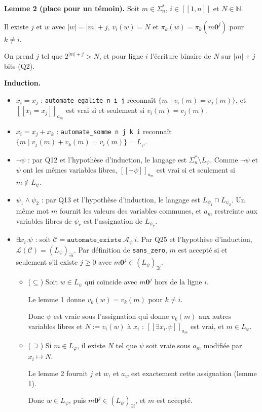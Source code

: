 \documentclass[11pt,a4paper]{article}
\providecommand{\tightlist}{\setlength{\itemsep}{0pt}\setlength{\parskip}{0pt}}
\begin{document}
\textbf{Lemme 2 (place pour un témoin).} Soit \(m\in\Sigma_n^*\), \(i\in[\![1,n]\!]\) et \(N\in\mathbb{N}\).

Il existe \(j\) et \(w\) avec \(|w|=|m|+j\), \(v_i(w)=N\) et \(\pi_k(w)=\pi_k(m{\mathbf{0}}^j)\) pour \(k\ne i\).

On prend \(j\) tel que \(2^{|m|+j}>N\), et pour ligne \(i\) l'écriture binaire de \(N\) sur \(|m|+j\) bits (Q2).

\textbf{Induction.}

\begin{itemize}
\tightlist
\item
  \textbf{\(x_i=x_j\)} : \texttt{automate\_egalite\ n\ i\ j} reconnaît \(\{m\mid v_i(m)=v_j(m)\}\), et \([\![x_i=x_j]\!]_{a_m}\) est vrai si et seulement si \(v_i(m)=v_j(m)\).
\item
  \textbf{\(x_i=x_j+x_k\)} : \texttt{automate\_somme\ n\ j\ k\ i} reconnaît \(\{m\mid v_j(m)+v_k(m)=v_i(m)\}=L_\varphi\).
\item
  \textbf{\(\neg\psi\)} : par Q12 et l'hypothèse d'induction, le langage est \(\Sigma_n^*\setminus L_\psi\). Comme \(\neg\psi\) et \(\psi\) ont les mêmes variables libres, \([\![\neg\psi]\!]_{a_m}\) est vrai si et seulement si \(m\notin L_\psi\).
\item
  \textbf{\(\psi_1\wedge\psi_2\)} : par Q13 et l'hypothèse d'induction, le langage est \(L_{\psi_1}\cap L_{\psi_2}\). Un même mot \(m\) fournit les valeurs des variables communes, et \(a_m\) restreinte aux variables libres de \(\psi_r\) est l'assignation de \(L_{\psi_r}\).
\item
  \textbf{\(\exists x_i.\psi\)} : soit \(\mathcal{C}=\texttt{automate\_existe}\ {\mathcal{A}}_\psi\ i\). Par Q25 et l'hypothèse d'induction, \(\mathcal{L}(\mathcal{C})=(L_\psi)_{\exists i}\). Par définition de \texttt{sans\_zero}, \(m\) est accepté si et seulement s'il existe \(j\ge0\) avec \(m{\mathbf{0}}^j\in(L_\psi)_{\exists i}\).

  \begin{itemize}
  \item
    (\(\subseteq\)) Soit \(w\in L_\psi\) qui coïncide avec \(m{\mathbf{0}}^j\) hors de la ligne \(i\).

    Le lemme 1 donne \(v_k(w)=v_k(m)\) pour \(k\ne i\).

    Donc \(\psi\) est vraie sous l'assignation qui donne \(v_k(m)\) aux autres variables libres et \(N:=v_i(w)\) à \(x_i\) : \([\![\exists x_i.\psi]\!]_{a_m}\) est vrai, et \(m\in L_\varphi\).
  \item
    (\(\supseteq\)) Si \(m\in L_\varphi\), il existe \(N\) tel que \(\psi\) soit vraie sous \(a_m\) modifiée par \(x_i\mapsto N\).

    Le lemme 2 fournit \(j\) et \(w\), et \(a_w\) est exactement cette assignation (lemme 1).

    Donc \(w\in L_\psi\), puis \(m{\mathbf{0}}^j\in(L_\psi)_{\exists i}\), et \(m\) est accepté.
  \end{itemize}
\end{itemize}
\end{document}
